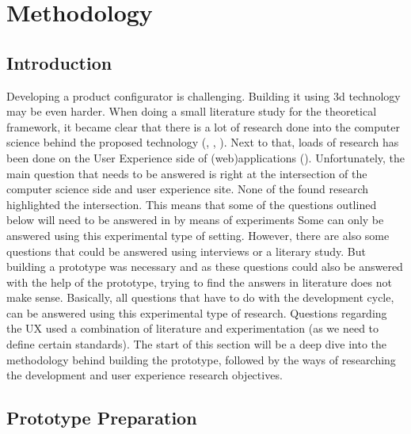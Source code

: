 

\chapter{Methodology}
\label{chapter:methodology}
\section{Introduction}
Developing a product configurator is challenging. Building it using 3d technology may be even harder. When doing a small literature study for the theoretical framework, it became clear that there is a lot of research done into the computer science behind the proposed technology (\cite{openGLsite}, \cite{microservices}, \cite{heteregoneousComputingTechniques}). Next to that, loads of research has been done on the User Experience side of (web)applications (\cite{nielsonNormanReports}). Unfortunately, the main question that needs to be answered is right at the intersection of the computer science side and user experience site. None of the found research highlighted the intersection. This means that some of the questions outlined below will need to be answered in by means of experiments
Some can only be answered using this experimental type of setting. However, there are also some questions that could be answered using interviews or a literary study. But building a prototype was necessary and as these questions could also be answered with the help of the prototype, trying to find the answers in literature does not make sense.
Basically, all questions that have to do with the development cycle, can be answered using this experimental type of research. Questions regarding the UX used a combination of literature and experimentation (as we need to define certain standards). The start of this section will be a deep dive into the methodology behind building the prototype, followed by the ways of researching the development and user experience research objectives.

\section{Prototype Preparation}
